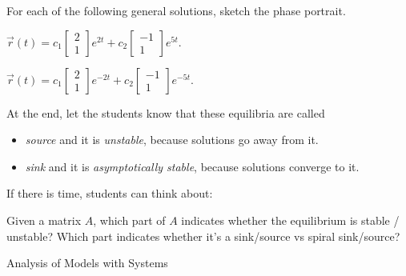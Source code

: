 \question
	For each of the following general solutions, sketch the phase portrait.
\begin{parts}
	\item $	\vec{r}(t) = c_1 \begin{bmatrix} 2 \\ 1 \end{bmatrix} e^{2t} + c_2 \begin{bmatrix} -1 \\ 1 \end{bmatrix} e^{5t}.$
	\item $	\vec{r}(t) = c_1 \begin{bmatrix} 2 \\ 1 \end{bmatrix} e^{-2t} + c_2 \begin{bmatrix} -1 \\ 1 \end{bmatrix} e^{-5t}.$	
\end{parts}
\begin{annotation}
	\begin{goals}
	At the end, let the students know that these equilibria are called 
	\begin{itemize}
		\item \emph{source} and it is \emph{unstable}, because solutions go away from it.
		\item \emph{sink} and it is \emph{asymptotically stable}, because solutions converge to it.
	\end{itemize}
	
	If there is time, students can think about:

	Given a matrix $A$, which part of $A$ indicates whether the equilibrium is stable / unstable? Which part indicates whether it's a sink/source vs spiral sink/source?
	\end{goals}
\end{annotation}







%
%



\begin{module}{Analysis of Models with Systems}
	\label{sys:analysis}

	
	
\end{module}



